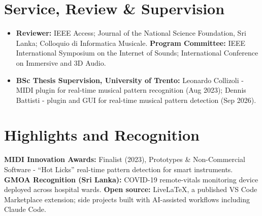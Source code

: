 \documentclass[11pt]{article}
\begin{document}
\enlargethispage{3\baselineskip}
\section*{Service, Review \& Supervision}
\begin{itemize}[leftmargin=1.2em, itemsep=-0.25em]
    \item \textbf{Reviewer:} IEEE Access; Journal of the National Science Foundation, Sri Lanka; Colloquio di Informatica Musicale. \textbf{Program Committee:} IEEE International Symposium on the Internet of Sounds; International Conference on Immersive and 3D Audio.
    \item \textbf{BSc Thesis Supervision, University of Trento:} Leonardo Collizoli - MIDI plugin for real-time musical pattern recognition (Aug 2023); Dennis Battisti - plugin and GUI for real-time musical pattern detection (Sep 2026).
\end{itemize}

\section*{Highlights and Recognition}
\textbf{MIDI Innovation Awards:} Finalist (2023), Prototypes \& Non-Commercial Software - ``Hot Licks'' real-time pattern detection for smart instruments. \textbf{GMOA Recognition (Sri Lanka):} COVID-19 remote-vitals monitoring device deployed across hospital wards. \textbf{Open source:} LiveLaTeX, a published VS Code Marketplace extension; side projects built with AI-assisted workflows including Claude Code.
\end{document}
